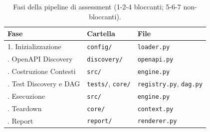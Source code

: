 \begin{table}[ht]
  \centering
  \small
  \begin{tabular}{@{}lll@{}}
    \toprule
    \textbf{Fase}                 & \textbf{Cartella}               & \textbf{File}                         \\
    \midrule
    1. Inizializzazione           & \texttt{config/}                & \texttt{loader.py}                    \\
    \addlinespace
    2. OpenAPI Discovery          & \texttt{discovery/}             & \texttt{openapi.py}                   \\
    \addlinespace
    3. Costruzione Contesti       & \texttt{src/}                   & \texttt{engine.py}                    \\
    \addlinespace
    4. Test Discovery e \gls{DAG} & \texttt{tests/}, \texttt{core/} & \texttt{registry.py}, \texttt{dag.py} \\
    \addlinespace
    5. Esecuzione                 & \texttt{src/}                   & \texttt{engine.py}                    \\
    \addlinespace
    6. Teardown                   & \texttt{core/}                  & \texttt{context.py}                   \\
    \addlinespace
    7. Report                     & \texttt{report/}                & \texttt{renderer.py}                  \\
    \bottomrule
  \end{tabular}
  \caption{Fasi della pipeline di assessment (1-2-4 bloccanti; 5-6-7 non-bloccanti).}
  \label{tab:pipeline-fasi}
\end{table}
